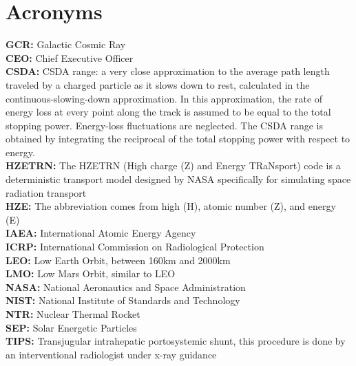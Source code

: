 \chapter*{Acronyms}

\textbf{GCR: } Galactic Cosmic Ray\\
\textbf{CEO: } Chief Executive Officer\\
\textbf{CSDA: } CSDA range: a very close approximation to the average path length traveled by a charged particle as it slows down to rest, calculated in the continuous-slowing-down approximation. In this approximation, the rate of energy loss at every point along the track is assumed to be equal to the total stopping power. Energy-loss fluctuations are neglected. The CSDA range is obtained by integrating the reciprocal of the total stopping power with respect to energy.\\
\textbf{HZETRN: } The HZETRN (High charge (Z) and Energy TRaNsport) code is a deterministic transport model designed by NASA specifically for simulating space radiation transport\\
\textbf{HZE: } The abbreviation comes from high (H), atomic number (Z), and energy (E)\\
\textbf{IAEA: } International Atomic Energy Agency\\
\textbf{ICRP: } International Commission on Radiological Protection\\
\textbf{LEO: } Low Earth Orbit, between 160km and 2000km\\
\textbf{LMO: } Low Mars Orbit, similar to LEO\\
\textbf{NASA: } National Aeronautics and Space Administration\\
\textbf{NIST: } National Institute of Standards and Technology\\
\textbf{NTR: } Nuclear Thermal Rocket\\
\textbf{SEP: } Solar Energetic Particles\\
\textbf{TIPS: } Transjugular intrahepatic portosystemic shunt, this procedure is done by an interventional radiologist under x-ray guidance


\newpage
